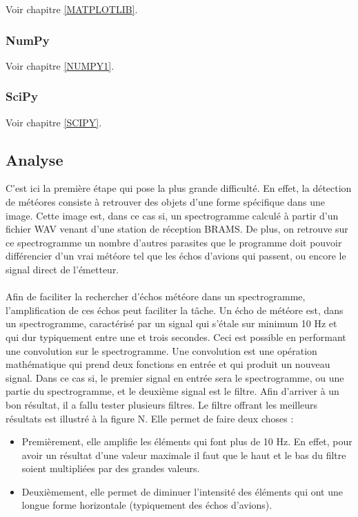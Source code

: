 \documentclass[11pt]{article}
\begin{document}
Voir chapitre \ref{MATPLOTLIB}.

\subsubsection{NumPy}

Voir chapitre \ref{NUMPY1}.

\subsubsection{SciPy}

Voir chapitre \ref{SCIPY}.

\subsection{Analyse}

C'est ici la première étape qui pose la plus grande difficulté.
En effet, la détection de météores consiste à retrouver des objets d'une forme spécifique dans une image.
Cette image est, dans ce cas si, un spectrogramme calculé à partir d'un fichier WAV venant d'une station de réception BRAMS.
De plus, on retrouve sur ce spectrogramme un nombre d'autres parasites que le programme doit pouvoir différencier d'un vrai météore tel que les échos d'avions qui passent, ou encore le signal direct de l'émetteur.\\
\\
Afin de faciliter la rechercher d'échos météore dans un spectrogramme, l'amplification de ces échos peut faciliter la tâche.
Un écho de météore est, dans un spectrogramme, caractérisé par un signal qui s'étale sur minimum 10 Hz et qui dur typiquement entre une et trois secondes.
Ceci est possible en performant une convolution sur le spectrogramme.
Une convolution est une opération mathématique qui prend deux fonctions en entrée et qui produit un nouveau signal.
Dans ce cas si, le premier signal en entrée sera le spectrogramme, ou une partie du spectrogramme, et le deuxième signal est le filtre.
Afin d'arriver à un bon résultat, il a fallu tester plusieurs filtres.
Le filtre offrant les meilleurs résultats est illustré à la figure N.
Elle permet de faire deux choses :

\begin{itemize}
    \item Premièrement, elle amplifie les éléments qui font plus de 10 Hz.
          En effet, pour avoir un résultat d'une valeur maximale il faut que le haut et le bas du filtre soient multipliées par des grandes valeurs.
    \item Deuxièmement, elle permet de diminuer l'intensité des éléments qui ont une longue forme horizontale (typiquement des échos d'avions).
\end{itemize}
\end{document}
